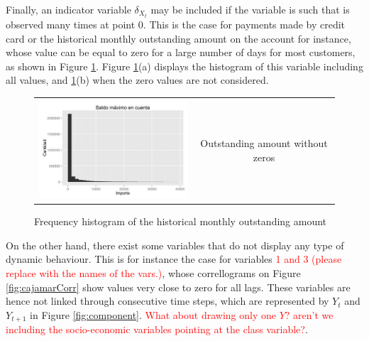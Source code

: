 Finally, an indicator variable $\delta_{X_t}$ may be included if the variable is such that is observed many times at point 0. This is the case for payments made by credit card or the historical monthly outstanding amount on the account for instance, whose value can be equal to zero for a large number of days for most customers, as shown in Figure \ref{fig:CajamarIndicatorVar}. Figure \ref{fig:CajamarIndicatorVar}(a) displays the histogram of this variable including all values, and \ref{fig:CajamarIndicatorVar}(b) when the zero values are not considered.

\begin{figure}
  \centering
    \begin{tabular}{cc}
    \includegraphics[width=70mm]{figures/CajaMarOutsAmount}&
    \begin{minipage}[b]{0.45\linewidth} Outstanding amount without zeros\end{minipage}\\
  \end{tabular}
    \caption{\label{fig:CajamarIndicatorVar}Frequency histogram of the historical monthly outstanding amount}
\end{figure}

On the other hand, there exist some variables that do not display any type of dynamic behaviour. This is for instance the case for variables \textcolor{red}{1 and 3 (please replace with the names of the vars.)}, whose correllograms on Figure \ref{fig:cajamarCorr} show values very close to zero for all lags. These variables are hence not linked through consecutive time steps, which are represented by $Y_{t}$ and $Y_{t+1}$ in Figure \ref{fig:component}. \textcolor{red}{What about drawing only one $Y$? aren't we including the socio-economic variables pointing at the class variable?}. 

